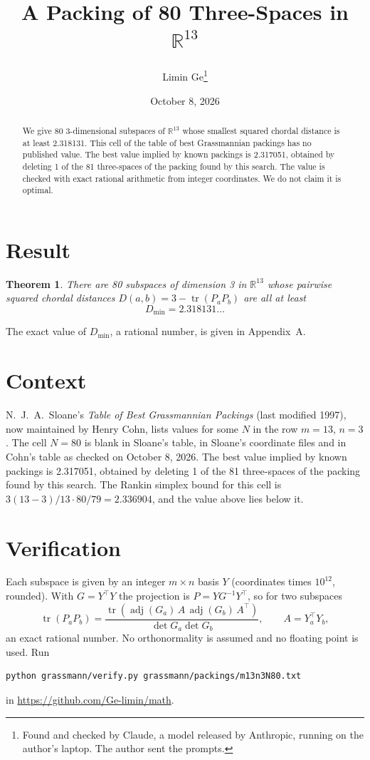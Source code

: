 \documentclass[11pt,a4paper]{article}
\title{A Packing of 80 Three-Spaces in $\mathbb{R}^{13}$}
\author{Limin Ge\thanks{Found and checked by Claude, a model released by Anthropic, running on the author's laptop. The author sent the prompts.}}
\date{October 8, 2026}
\newtheorem*{theorem}{Theorem}
\begin{document}
\maketitle
\begin{abstract}
We give 80 3-dimensional subspaces of $\mathbb{R}^{13}$ whose smallest squared chordal distance is at least 2.318131. This cell of the table of best Grassmannian packings has no published value. The best value implied by known packings is 2.317051, obtained by deleting 1 of the 81 three-spaces of the packing found by this search. The value is checked with exact rational arithmetic from integer coordinates. We do not claim it is optimal.
\end{abstract}

\section{Result}
\begin{theorem}
There are 80 subspaces of dimension 3 in $\mathbb{R}^{13}$ whose pairwise squared chordal distances $D(a,b) = 3 - \operatorname{tr}(P_aP_b)$ are all at least
\[ D_{\min} = 2.318131\ldots \]
\end{theorem}
The exact value of $D_{\min}$, a rational number, is given in Appendix~A.


\section{Context}
N.~J.~A.~Sloane's \emph{Table of Best Grassmannian Packings} (last modified 1997), now maintained by Henry Cohn, lists values for some $N$ in the row $m=13$, $n=3$. The cell $N=80$ is blank in Sloane's table, in Sloane's coordinate files and in Cohn's table as checked on October 8, 2026. The best value implied by known packings is 2.317051, obtained by deleting 1 of the 81 three-spaces of the packing found by this search. The Rankin simplex bound for this cell is $3(13-3)/13\cdot 80/79 = 2.336904$, and the value above lies below it.


\section{Verification}
Each subspace is given by an integer $m\times n$ basis $Y$ (coordinates times $10^{12}$, rounded). With $G=Y^\top Y$ the projection is $P=YG^{-1}Y^\top$, so for two subspaces
\[ \operatorname{tr}(P_aP_b)=\frac{\operatorname{tr}(\operatorname{adj}(G_a)\,A\,\operatorname{adj}(G_b)\,A^\top)}{\det G_a\det G_b},\qquad A=Y_a^\top Y_b, \]
an exact rational number. No orthonormality is assumed and no floating point is used. Run
\begin{verbatim}
python grassmann/verify.py grassmann/packings/m13n3N80.txt
\end{verbatim}
in \url{https://github.com/Ge-limin/math}.
\end{document}
